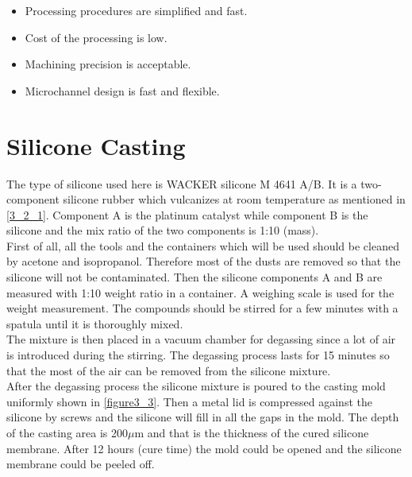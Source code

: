 \begin{itemize}
	\item Processing procedures are simplified and fast.
	\item Cost of the processing is low.
	\item Machining precision is acceptable.
	\item Microchannel design is fast and flexible.
\end{itemize}

\section{Silicone Casting}
\label{3_3}
The type of silicone used here is WACKER silicone M 4641 A/B. It is a two-component silicone rubber which vulcanizes at room temperature as mentioned in \autoref{3_2_1}. Component A is the platinum catalyst while component B is the silicone and the mix ratio of the two components is 1:10 (mass). \\

First of all, all the tools and the containers which will be used should be cleaned by acetone and isopropanol. Therefore most of the dusts are removed so that the silicone will not be contaminated.
Then the silicone components A and B are measured with 1:10 weight ratio in a container. A weighing scale is used for the weight measurement. The compounds should be stirred for a few minutes with a spatula until it is thoroughly mixed.\\

The mixture is then placed in a vacuum chamber for degassing since a lot of air is introduced during the stirring. The degassing process lasts for 15 minutes so that the most of the air can be removed from the silicone mixture.\\

After the degassing process the silicone mixture is poured to the casting mold uniformly shown in \autoref{figure3_3}. Then a metal lid is compressed against the silicone by screws and the silicone will fill in all the gaps in the mold. The depth of the casting area is 200$\mu$m and that is the thickness of the cured silicone membrane. After 12 hours (cure time) the mold could be opened and the silicone membrane could be peeled off.\\

